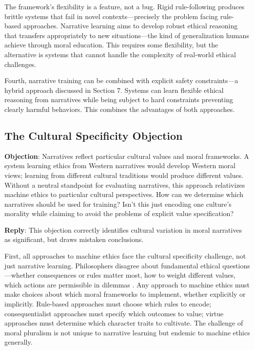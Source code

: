 \documentclass[12pt]{article}
\begin{document}
The framework's flexibility is a feature, not a bug. Rigid rule-following produces brittle systems that fail in novel contexts---precisely the problem facing rule-based approaches. Narrative learning aims to develop robust ethical reasoning that transfers appropriately to new situations---the kind of generalization humans achieve through moral education. This requires some flexibility, but the alternative is systems that cannot handle the complexity of real-world ethical challenges.

Fourth, narrative training can be combined with explicit safety constraints---a hybrid approach discussed in Section 7. Systems can learn flexible ethical reasoning from narratives while being subject to hard constraints preventing clearly harmful behaviors. This combines the advantages of both approaches.

\subsection{The Cultural Specificity Objection}

\textbf{Objection}: Narratives reflect particular cultural values and moral frameworks. A system learning ethics from Western narratives would develop Western moral views; learning from different cultural traditions would produce different values. Without a neutral standpoint for evaluating narratives, this approach relativizes machine ethics to particular cultural perspectives. How can we determine which narratives should be used for training? Isn't this just encoding one culture's morality while claiming to avoid the problems of explicit value specification?

\textbf{Reply}: This objection correctly identifies cultural variation in moral narratives as significant, but draws mistaken conclusions.

First, all approaches to machine ethics face the cultural specificity challenge, not just narrative learning. Philosophers disagree about fundamental ethical questions---whether consequences or rules matter most, how to weight different values, which actions are permissible in dilemmas \citep{beauchamp2001principles}. Any approach to machine ethics must make choices about which moral frameworks to implement, whether explicitly or implicitly. Rule-based approaches must choose which rules to encode; consequentialist approaches must specify which outcomes to value; virtue approaches must determine which character traits to cultivate. The challenge of moral pluralism is not unique to narrative learning but endemic to machine ethics generally.
\end{document}
